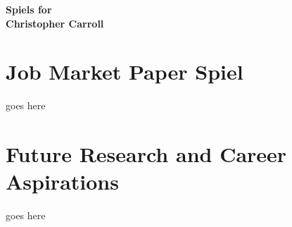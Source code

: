 \documentclass[11pt]{article}
\begin{document}
\begin{center}
{\Large {\bf Spiels for }}
\\[5pt]
{\large {\bf Christopher Carroll}}
\end{center}

\vspace{.3cm}

\section{\large Job Market Paper Spiel} goes here 

\section{\large Future Research and Career Aspirations} goes here 
\end{document}
